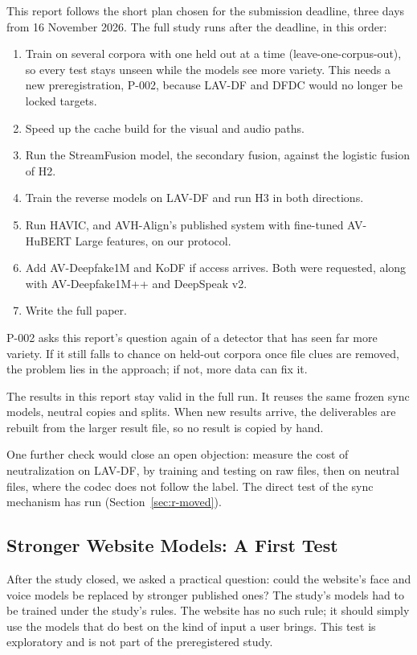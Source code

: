 This report follows the short plan chosen for the submission deadline, three
days from 16 November 2026. The full study runs after the deadline, in this
order:

\begin{enumerate}
    \item Train on several corpora with one held out at a time
    (leave-one-corpus-out), so every test stays unseen while the models see
    more variety. This needs a new preregistration, P-002, because LAV-DF and
    DFDC would no longer be locked targets.
    \item Speed up the cache build for the visual and audio paths.
    \item Run the StreamFusion model, the secondary fusion, against the
    logistic fusion of H2.
    \item Train the reverse models on LAV-DF and run H3 in both directions.
    \item Run HAVIC, and AVH-Align's published system with fine-tuned
    AV-HuBERT Large features, on our protocol.
    \item Add AV-Deepfake1M and KoDF if access arrives. Both were requested,
    along with AV-Deepfake1M++ and DeepSpeak v2.
    \item Write the full paper.
\end{enumerate}

P-002 asks this report's question again of a detector that has seen far
more variety. If it still falls to chance on held-out corpora once file clues
are removed, the problem lies in the approach; if not, more data can fix it.

The results in this report stay valid in the full run. It reuses the same
frozen sync models, neutral copies and splits. When new results arrive, the
deliverables are rebuilt from the larger result file, so no result is copied
by hand.

One further check would close an open objection: measure the cost of
neutralization on LAV-DF, by training and testing on raw files, then on
neutral files, where the codec does not follow the label. The direct test of
the sync mechanism has run (Section~\ref{sec:r-moved}).

\subsection{Stronger Website Models: A First Test}
\label{sec:f-v2}

After the study closed, we asked a practical question: could the website's
face and voice models be replaced by stronger published ones? The study's
models had to be trained under the study's rules. The website has no such
rule; it should simply use the models that do best on the kind of input a user
brings. This test is exploratory and is not part of the preregistered study.

